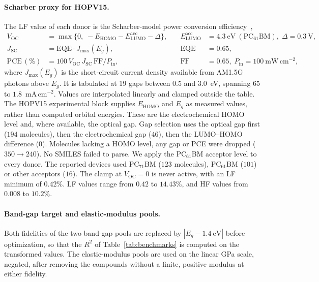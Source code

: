 \paragraph{Scharber proxy for HOPV15.}
The LF value of each donor is the Scharber-model power conversion efficiency~\citep{scharber2006design},
\begin{equation}
\begin{aligned}
V_{\mathrm{OC}} &= \max\{0,\; -E_{\mathrm{HOMO}} - E^{\mathrm{acc}}_{\mathrm{LUMO}} - \Delta\}, &\quad E^{\mathrm{acc}}_{\mathrm{LUMO}} &= 4.3~\mathrm{eV}~(\mathrm{PC}_{61}\mathrm{BM}),\; \Delta = 0.3~\mathrm{V},\\
J_{\mathrm{SC}} &= \mathrm{EQE}\cdot J_{\max}(E_g), &\quad \mathrm{EQE} &= 0.65,\\
\mathrm{PCE}\,(\%) &= 100\, V_{\mathrm{OC}}\, J_{\mathrm{SC}}\,\mathrm{FF}/P_{\mathrm{in}}, &\quad \mathrm{FF} &= 0.65,\; P_{\mathrm{in}} = 100~\mathrm{mW\,cm^{-2}},
\end{aligned}
\end{equation}
where $J_{\max}(E_g)$ is the short-circuit current density available from AM1.5G photons above $E_g$. It is tabulated at 19 gaps between $0.5$ and $3.0$~eV, spanning $65$ to $1.8$~mA\,cm$^{-2}$. Values are interpolated linearly and clamped outside the table. The HOPV15 experimental block supplies $E_{\mathrm{HOMO}}$ and $E_g$ as measured values, rather than computed orbital energies. These are the electrochemical HOMO level and, where available, the optical gap. Gap selection uses the optical gap first ($194$ molecules), then the electrochemical gap ($46$), then the LUMO--HOMO difference ($0$). Molecules lacking a HOMO level, any gap or PCE were dropped ($350 \to 240$). No SMILES failed to parse. We apply the PC$_{61}$BM acceptor level to every donor. The reported devices used PC$_{71}$BM ($123$ molecules), PC$_{61}$BM ($101$) or other acceptors ($16$). The clamp at $V_{\mathrm{OC}} = 0$ is never active, with an LF minimum of $0.42\%$. LF values range from $0.42$ to $14.43\%$, and HF values from $0.008$ to $10.2\%$.

\paragraph{Band-gap target and elastic-modulus pools.}
Both fidelities of the two band-gap pools are replaced by $|E_g - 1.4~\mathrm{eV}|$ before optimization, so that the $R^2$ of Table~\ref{tab:benchmarks} is computed on the transformed values. The elastic-modulus pools are used on the linear GPa scale, negated, after removing the compounds without a finite, positive modulus at either fidelity.

